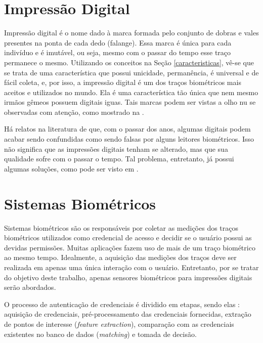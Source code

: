 \section{Impressão Digital}
Impressão digital é o nome dado à marca formada pelo conjunto de dobras e vales presentes na ponta de cada dedo (falange). Essa marca é única para cada indivíduo e é imutável, ou seja, mesmo com o passar do tempo esse traço permanece o mesmo. Utilizando os conceitos na Seção \ref{caracteristicas}, vê-se que se trata de uma característica que possui unicidade, permanência, é universal e de fácil coleta, e, por isso, a impressão digital é um dos traços biométricos mais aceitos e utilizados no mundo. Ela é uma característica tão única que nem mesmo irmãos gêmeos possuem digitais iguas. Tais marcas podem ser vistas a olho nu se observadas com atenção, como mostrado na .%

Há relatos na literatura de que, com o passar dos anos, algumas digitais podem acabar sendo confundidas como sendo falsas por alguns leitores biométricos. Isso não significa que as impressões digitais tenham se alterado, mas que sua qualidade sofre com o passar o tempo. Tal problema, entretanto, já possui algumas soluções, como pode ser visto em  \cite{modular_architecture}.

%

\section{Sistemas Biométricos}
Sistemas biométricos são os responsáveis por coletar as medições dos traços biométricos utilizados como credencial de acesso e decidir se o usuário possui as devidas permissões. Muitas aplicações fazem uso de mais de um traço biométrico ao mesmo tempo. Idealmente, a aquisição das medições dos traços deve ser realizada em apenas uma única interação com o usuário. Entretanto, por se tratar do objetivo deste trabalho, apenas sensores biométricos para impressões digitais serão abordados.

O processo de autenticação de credenciais é dividido em etapas, sendo elas \cite{2D_3D_survey, introducao_biometria}: aquisição de credenciais, pré-processamento das credenciais fornecidas, extração de pontos de interesse (\textit{feature extraction}), comparação com as credenciais existentes no banco de dados (\textit{matching}) e tomada de decisão.

